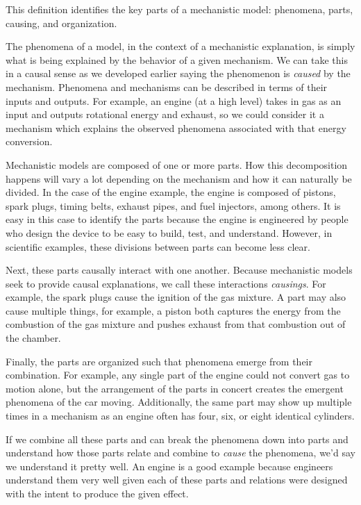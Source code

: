 This definition identifies the key parts of a mechanistic model:
phenomena, parts, causing, and organization.

The phenomena of a model, in the context of a mechanistic explanation,
is simply what is being explained by the behavior of a given mechanism.
We can take this in a causal sense as we developed earlier saying the
phenomenon is \emph{caused} by the mechanism. Phenomena and mechanisms
can be described in terms of their inputs and outputs. For example, an
engine (at a high level) takes in gas as an input and outputs rotational
energy and exhaust, so we could consider it a mechanism which explains
the observed phenomena associated with that energy conversion.

Mechanistic models are composed of one or more parts. How this
decomposition happens will vary a lot depending on the mechanism and how
it can naturally be divided. In the case of the engine example, the
engine is composed of pistons, spark plugs, timing belts, exhaust pipes,
and fuel injectors, among others. It is easy in this case to identify
the parts because the engine is engineered by people who design the
device to be easy to build, test, and understand. However, in scientific
examples, these divisions between parts can become less clear.

Next, these parts causally interact with one another. Because
mechanistic models seek to provide causal explanations, we call these
interactions \emph{causings}. For example, the spark plugs cause the
ignition of the gas mixture. A part may also cause multiple things, for
example, a piston both captures the energy from the combustion of the
gas mixture and pushes exhaust from that combustion out of the chamber.

Finally, the parts are organized such that phenomena emerge from their
combination. For example, any single part of the engine could not
convert gas to motion alone, but the arrangement of the parts in concert
creates the emergent phenomena of the car moving. Additionally, the same
part may show up multiple times in a mechanism as an engine often has
four, six, or eight identical cylinders.

If we combine all these parts and can break the phenomena down into
parts and understand how those parts relate and combine to \emph{cause}
the phenomena, we'd say we understand it pretty well. An engine is a
good example because engineers understand them very well given each of
these parts and relations were designed with the intent to produce the
given effect.

